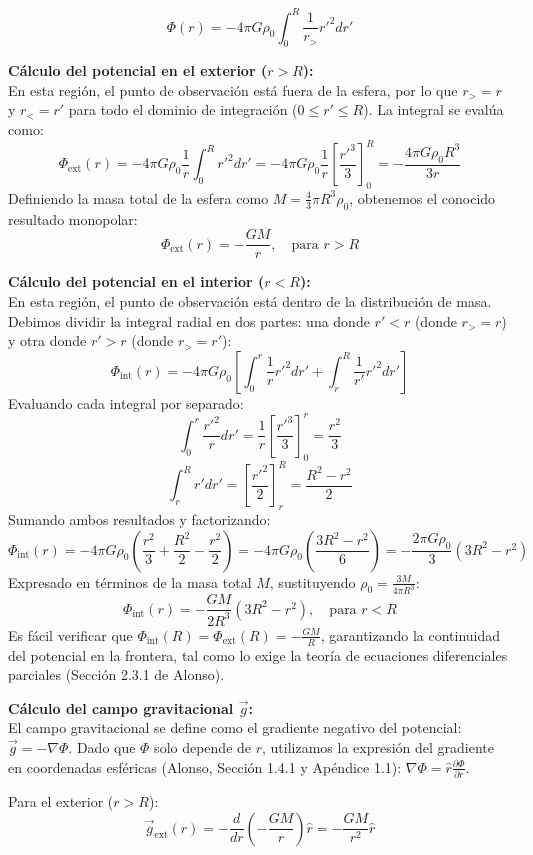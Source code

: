 \documentclass[a4paper]{article}
\begin{document}
$$
\Phi(r) = -4\pi G \rho_0 \int_0^R \frac{1}{r_{>}} r'^2 dr' 
$$

\textbf{Cálculo del potencial en el exterior ($r > R$):} \\
En esta región, el punto de observación está fuera de la esfera, por lo que $r_{>} = r$ y $r_{<} = r'$ para todo el dominio de integración ($0 \leq r' \leq R$). La integral se evalúa como:
$$
\Phi_{\text{ext}}(r) = -4\pi G \rho_0 \frac{1}{r} \int_0^R r'^2 dr' = -4\pi G \rho_0 \frac{1}{r} \left[ \frac{r'^3}{3} \right]_0^R = -\frac{4\pi G \rho_0 R^3}{3r}
$$
Definiendo la masa total de la esfera como $M = \frac{4}{3}\pi R^3 \rho_0$, obtenemos el conocido resultado monopolar:
$$
\Phi_{\text{ext}}(r) = -\frac{GM}{r}, \quad \text{para } r > R
$$

\textbf{Cálculo del potencial en el interior ($r < R$):} \\
En esta región, el punto de observación está dentro de la distribución de masa. Debimos dividir la integral radial en dos partes: una donde $r' < r$ (donde $r_{>} = r$) y otra donde $r' > r$ (donde $r_{>} = r'$):
$$
\Phi_{\text{int}}(r) = -4\pi G \rho_0 \left[ \int_0^r \frac{1}{r} r'^2 dr' + \int_r^R \frac{1}{r'} r'^2 dr' \right]
$$
Evaluando cada integral por separado:
$$
\int_0^r \frac{r'^2}{r} dr' = \frac{1}{r} \left[ \frac{r'^3}{3} \right]_0^r = \frac{r^2}{3}
$$
$$
\int_r^R r' dr' = \left[ \frac{r'^2}{2} \right]_r^R = \frac{R^2 - r^2}{2}
$$
Sumando ambos resultados y factorizando:
$$
\Phi_{\text{int}}(r) = -4\pi G \rho_0 \left( \frac{r^2}{3} + \frac{R^2}{2} - \frac{r^2}{2} \right) = -4\pi G \rho_0 \left( \frac{3R^2 - r^2}{6} \right) = -\frac{2\pi G \rho_0}{3} (3R^2 - r^2)
$$
Expresado en términos de la masa total $M$, sustituyendo $\rho_0 = \frac{3M}{4\pi R^3}$:
$$
\Phi_{\text{int}}(r) = -\frac{GM}{2R^3} (3R^2 - r^2), \quad \text{para } r < R
$$
Es fácil verificar que $\Phi_{\text{int}}(R) = \Phi_{\text{ext}}(R) = -\frac{GM}{R}$, garantizando la continuidad del potencial en la frontera, tal como lo exige la teoría de ecuaciones diferenciales parciales (Sección 2.3.1 de Alonso).

\textbf{Cálculo del campo gravitacional $\vec{g}$:} \\
El campo gravitacional se define como el gradiente negativo del potencial: $\vec{g} = -\nabla \Phi$. Dado que $\Phi$ solo depende de $r$, utilizamos la expresión del gradiente en coordenadas esféricas (Alonso, Sección 1.4.1 y Apéndice 1.1): $\nabla \Phi = \hat{r} \frac{\partial \Phi}{\partial r}$.

Para el exterior ($r > R$):
$$
\vec{g}_{\text{ext}}(r) = -\frac{d}{dr} \left( -\frac{GM}{r} \right) \hat{r} = -\frac{GM}{r^2} \hat{r}
$$
\end{document}

